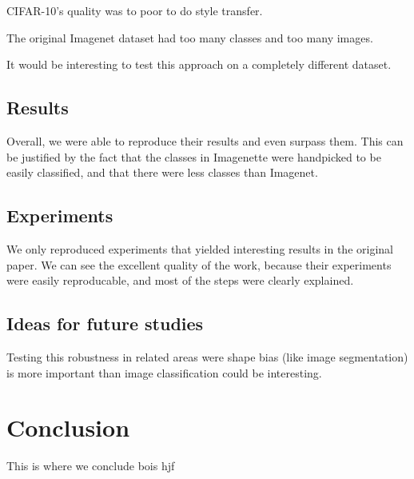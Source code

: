 \documentclass{article}
\begin{document}
CIFAR-10's quality was to poor to do style transfer.

The original Imagenet dataset had too many classes and too many images.

It would be interesting to test this approach on a completely different dataset.

\subsection{Results}

Overall, we were able to reproduce their results and
even surpass them. This can be justified by the fact that the classes
in Imagenette were handpicked to be easily classified, and that there were less 
classes than Imagenet.

\subsection{Experiments}

We only reproduced experiments that yielded interesting results 
in the original paper. We can see the excellent quality of the work, 
because their experiments were easily reproducable, and most of the 
steps were clearly explained.

\subsection{Ideas for future studies}

Testing this robustness in related areas were shape bias (like image segmentation) 
is more important than image classification could be interesting.

\section{Conclusion}

This is where we conclude bois hjf



\end{document}
